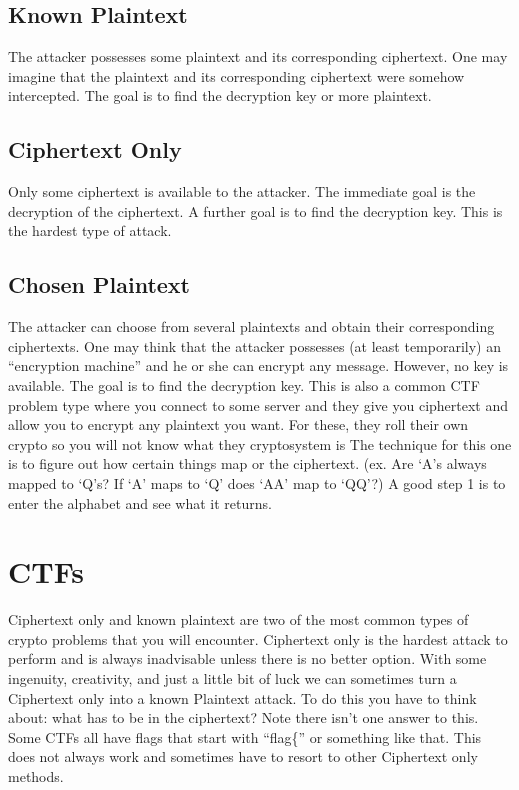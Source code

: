\documentclass{report}
\begin{document}
\subsection{Known Plaintext}
The attacker possesses some plaintext and its corresponding ciphertext. One may imagine that the plaintext and its corresponding ciphertext were somehow intercepted. The goal is to find the decryption key or more plaintext.

\subsection{Ciphertext Only}
Only some ciphertext is available to the attacker. The immediate goal is the decryption of the ciphertext. A further goal is to find the decryption key. This is the hardest type of attack.\newline \newline

\subsection{Chosen Plaintext}
The attacker can choose from several plaintexts and obtain their corresponding ciphertexts. One may think that the attacker possesses (at least temporarily) an “encryption machine” and he or she can encrypt any message. However, no key is available. The goal is to find the decryption key.
\newline \newline 
This is also a common CTF problem type where you connect to some server and they give you ciphertext and allow you to encrypt any plaintext you want.
\newline \newline For these, they roll their own crypto so you will not know what they cryptosystem is
\newline \newline The technique for this one is to figure out how certain things map or the ciphertext.  (ex. Are ‘A’s always mapped to ‘Q’s? If ‘A’ maps to ‘Q’ does ‘AA’ map to ‘QQ’?) A good step 1 is to enter the alphabet and see what it returns.
\newline

\section{CTFs}
\color{blue}Ciphertext only \color{black}  and \color{blue}known plaintext \color{black} are two of the most common types of crypto problems that you will encounter.  Ciphertext only is the hardest attack to perform and is always inadvisable unless there is no better option.  
With some ingenuity, creativity, and just a little bit of luck we can sometimes turn a Ciphertext only into a known Plaintext attack.  
To do this you have to think about: 
what has to be in the ciphertext?  
Note there isn't one answer to this.  Some CTFs all have flags that start with ``flag\{'' or something like that.
This does not always work and sometimes have to resort to other Ciphertext only methods.
\end{document}
